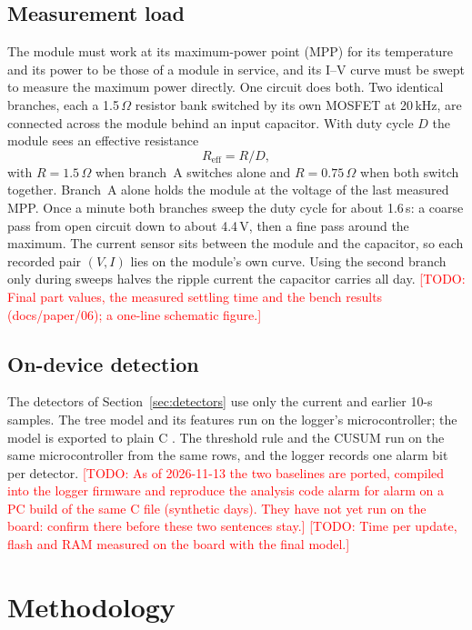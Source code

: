 \documentclass[conference]{IEEEtran}
\newcommand{\todo}[1]{\textcolor{red}{[TODO: #1]}}
\begin{document}
\subsection{Measurement load}
The module must work at its maximum-power point (MPP) for its temperature and its power
to be those of a module in service, and its I--V curve must be swept to measure the
maximum power directly. One circuit does both. Two identical branches, each a
1.5\,$\Omega$ resistor bank switched by its own MOSFET at 20\,kHz, are connected across
the module behind an input capacitor. With duty cycle $D$ the module sees an effective
resistance
\begin{equation}
R_\mathrm{eff} = R/D ,
\end{equation}
with $R=1.5\,\Omega$ when branch~A switches alone and $R=0.75\,\Omega$ when both switch
together. Branch~A alone holds the module at the voltage of the last measured MPP.
Once a minute both branches sweep the duty cycle for about 1.6\,s: a coarse pass from
open circuit down to about 4.4\,V, then a fine pass around the maximum. The current
sensor sits between the module and the capacitor, so each recorded pair $(V,I)$ lies on
the module's own curve. Using the second branch only during sweeps halves the ripple
current the capacitor carries all day. \todo{Final part values, the measured settling
time and the bench results (docs/paper/06); a one-line schematic figure.}

\subsection{On-device detection}\label{sec:ondevice}
The detectors of Section~\ref{sec:detectors} use only the current and earlier 10-s samples.
The tree model and its features run on the logger's microcontroller; the model is exported
to plain C \cite{m2cgen}. The threshold rule and the CUSUM run on the same microcontroller
from the same rows, and the logger records one alarm bit per detector.
\todo{As of 2026-11-13 the two baselines are ported, compiled into the logger firmware and
reproduce the analysis code alarm for alarm on a PC build of the same C file (synthetic
days). They have not yet run on the board: confirm there before these two sentences stay.}
\todo{Time per update, flash and RAM
measured on the board with the final model.}

\section{Methodology}
\end{document}
